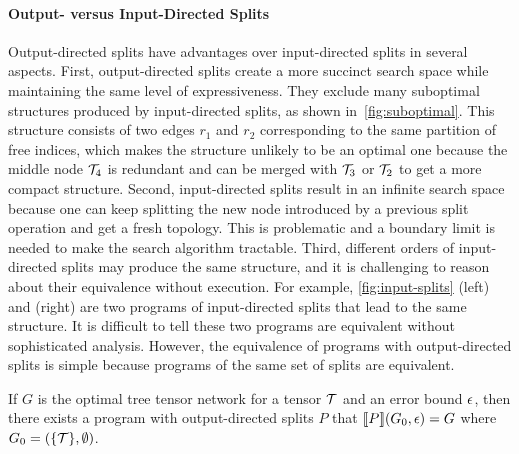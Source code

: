\paragraph{Output- versus Input-Directed Splits}
%
Output-directed splits have advantages over input-directed splits in several aspects.
%
First, output-directed splits create a more succinct search space while maintaining the same level of expressiveness.
%
They exclude many suboptimal structures produced by input-directed splits, as shown in~\cref{fig:suboptimal}.
%
This structure consists of two edges $r_1$ and $r_2$ corresponding to the same partition of free indices, which makes the structure unlikely to be an optimal one because the middle node $\mathcal{T}_4$ is redundant and can be merged with $\mathcal{T}_3$ or $\mathcal{T}_2$ to get a more compact structure.
%
%
Second, input-directed splits result in an infinite search space because one can keep splitting the new node introduced by a previous split operation and get a fresh topology.
%
This is problematic and a boundary limit is needed to make the search algorithm tractable.
%
Third, different orders of input-directed splits may produce the same structure, and it is challenging to reason about their equivalence without execution.
%
For example, \cref{fig:input-splits} (left) and (right) are two programs of input-directed splits that lead to the same structure.
%
It is difficult to tell these two programs are equivalent without sophisticated analysis.
%
However, the equivalence of programs with output-directed splits is simple because programs of the same set of splits are equivalent.

\begin{theorem}\label{thm:completeness}
If $G$ is the optimal tree tensor network for a tensor $\mathcal{T}$ and an error bound $\epsilon$,
then there exists a program with output-directed splits $P$ that $\llbracket P \rrbracket(G_0, \epsilon) = G$ where $G_0 = (\{\mathcal{T}\},\emptyset)$.
\end{theorem}

